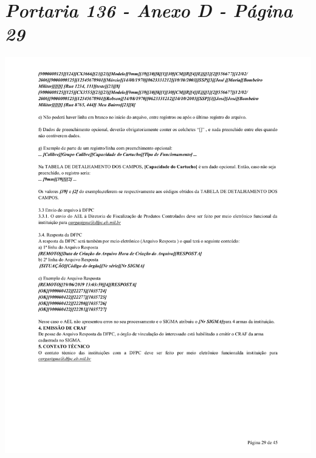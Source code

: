 \chapter{\textit{Portaria 136 - Anexo D - Página 29}}
\includegraphics[scale=0.8]{imagens/AnexoA4-AnexoD-portaria-136}


